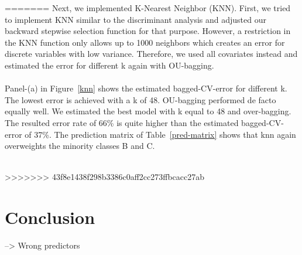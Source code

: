 \documentclass[11pt]{article}
\begin{document}
=======
Next, we implemented K-Nearest Neighbor (KNN). First, we tried to implement KNN similar to the discriminant analysis and adjusted our backward stepwise selection function for that purpose. However, a restriction in the KNN function only allows up to 1000 neighbors which creates an error for discrete variables with low variance. Therefore, we used all covariates instead and estimated the error for different k again with OU-bagging.\\
\\
Panel-(a) in Figure~\ref{knn} shows the estimated bagged-CV-error for different k. The lowest error is achieved with a k of 48. OU-bagging performed de facto equally well. We estimated the best model with k equal to 48 and over-bagging. The resulted error rate of 66\% is quite higher than the estimated bagged-CV-error of 37\%. The prediction matrix of Table~\ref{pred-matrix} shows that knn again overweights the minority classes B and C.\\
\\
\begin{figure}
     \hfill
\end{figure}
>>>>>>> 43f8e1438f298b3386c0aff2cc273ffbcacc27ab
\section{Conclusion}
--> Wrong predictors


\newpage



\end{document}
